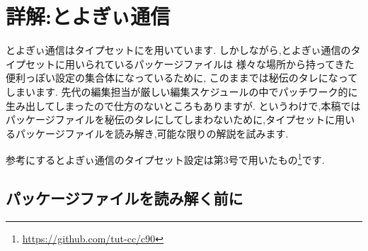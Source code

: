 \newcommand*{\reflisting}[1]{\lstlistingname\ref{#1}}
\renewcommand*\descriptionlabel[1]{\normalfont\headfont #1 :\hfil}

\chapter{詳解:とよぎぃ通信}

とよぎぃ通信はタイプセットに{\pLaTeX}を用いています.
しかしながら,とよぎぃ通信のタイプセットに用いられているパッケージファイルは
様々な場所から持ってきた便利っぽい設定の集合体になっているために,
このままでは秘伝のタレになってしまいます.
先代の編集担当が厳しい編集スケジュールの中でパッチワーク的に生み出してしまったので仕方のないところもありますが.
というわけで,本稿ではパッケージファイルを秘伝のタレにしてしまわないために,タイプセットに用いるパッケージファイルを読み解き,可能な限りの解説を試みます.

参考にするとよぎぃ通信のタイプセット設定は第3号で用いたもの\footnote{\url{https://github.com/tut-cc/c90}}です.

\section{パッケージファイルを読み解く前に}
